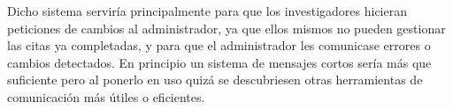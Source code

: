 \begin{itemize}
  Dicho sistema serviría principalmente para que los investigadores hicieran peticiones de cambios al administrador, ya que ellos mismos no pueden gestionar las citas ya completadas, y para que el administrador les comunicase errores o cambios detectados. En principio un sistema de mensajes cortos sería más que suficiente pero al ponerlo en uso quizá se descubriesen otras herramientas de comunicación más útiles o eficientes. \\

\end{itemize}